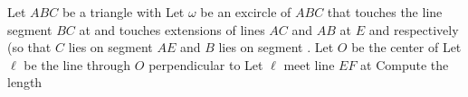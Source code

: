 Let $ ABC$ be a triangle with    Let $ \omega$ be an excircle of $ ABC$ that touches the line segment $ BC$ at  and touches extensions of lines $ AC$ and $ AB$ at $ E$ and  respectively (so that $ C$ lies on segment $ AE$ and $ B$ lies on segment . Let $ O$ be the center of  Let $ \ell$ be the line through $ O$ perpendicular to  Let $ \ell$ meet line $ EF$ at  Compute the length 